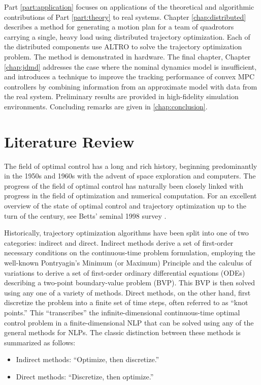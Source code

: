 \documentclass[../root.tex]{subfiles}
\begin{document}
Part \ref{part:application} focuses on applications of the theoretical and 
algorithmic contributions of Part \ref{part:theory} to real systems. 
Chapter \ref{chap:distributed} describes a method for generating a 
motion plan for a team of quadrotors carrying a single, heavy load using 
distributed trajectory optimization. Each of the distributed components 
use ALTRO to solve the trajectory optimization problem. The method 
is demonstrated in hardware. The final chapter, Chapter \ref{chap:jdmd} addresses the 
case where the nominal dynamics model is insufficient, and introduces a technique to 
improve the tracking performance of convex MPC controllers by combining information from 
an approximate model with data from the real system. Preliminary results are provided 
in high-fidelity simulation environments. Concluding remarks are given in 
\ref{chap:conclusion}.


\section{Literature Review} \label{sec:lit_review}
The field of optimal control has a long and rich history, beginning predominantly in the 
1950s and 1960s with the advent of space exploration and computers. The progress of the field of 
optimal control has naturally been closely linked with progress in the field of optimization 
and numerical computation. For an excellent overview of the state of optimal control
and trajectory optimization up to the turn of the century, see Betts' seminal 1998 survey 
\cite{betts_Survey_1998}. 

Historically, trajectory optimization algorithms have been split into one of two categories:
indirect and direct. Indirect methods derive a set of first-order necessary conditions on the 
continuous-time problem formulation, employing the well-known Pontryagin's Minimum (or Maximum)
Principle and the calculus of variations to derive a set of first-order ordinary differential 
equations (ODEs) describing a two-point boundary-value problem (BVP). This BVP is then solved
using any one of a variety of methods. Direct methods, on the other hand, first discretize the 
problem into a finite set of time steps, often referred to as ``knot points.'' This ``transcribes''
the infinite-dimensional continuous-time optimal control problem in a finite-dimensional NLP that
can be solved using any of the general methods for NLPs. The classic distinction between these 
methods is summarized as follows:
\begin{itemize}
	\item Indirect methods: ``Optimize, then discretize.''
	\item Direct methods: ``Discretize, then optimize.''
\end{itemize}
\end{document}

